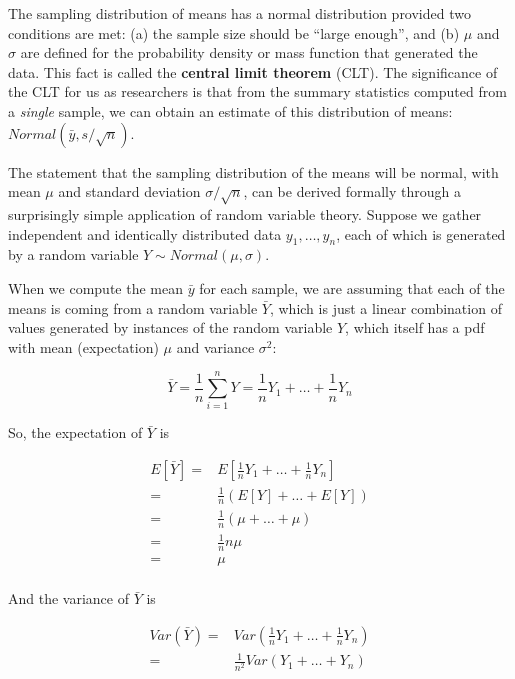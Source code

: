 \documentclass[12pt,]{krantz}
\begin{document}
The sampling distribution of means has a normal distribution provided two conditions are met: (a) the sample size should be ``large enough'', and (b) \(\mu\) and \(\sigma\) are defined for the probability density or mass function that generated the data. This fact is called the \textbf{central limit theorem} (CLT). The significance of the CLT for us as researchers is that from the summary statistics computed from a \emph{single} sample, we can obtain an estimate of this distribution of means: \(Normal(\bar{y},s/\sqrt{n})\).

The statement that the sampling distribution of the means will be normal, with mean \(\mu\) and standard deviation \(\sigma/\sqrt{n}\), can be derived formally through a surprisingly simple application of random variable theory. Suppose we gather independent and identically distributed data \(y_1, \dots, y_n\), each of which is generated by a random variable \(Y\sim Normal(\mu,\sigma)\).

When we compute the mean \(\bar{y}\) for each sample, we are assuming that each of the means is coming from a random variable \(\bar{Y}\), which is just a linear combination of values generated by instances of the random variable \(Y\), which itself has a pdf with mean (expectation) \(\mu\) and variance \(\sigma^2\):

\begin{equation}
\bar{Y}=\frac{1}{n} \sum_{i=1}^n Y = \frac{1}{n}Y_1 + \dots + \frac{1}{n}Y_n
 \end{equation}

So, the expectation of \(\bar{Y}\) is

\begin{equation}
\begin{split}
E[\bar{Y}] =& E[\frac{1}{n}Y_1 + \dots + \frac{1}{n}Y_n]\\
=& \frac{1}{n} (E[Y] + \dots + E[Y])\\
=& \frac{1}{n} (\mu + \dots + \mu)\\
=& \frac{1}{n} n\mu \\
=& \mu \\
\end{split}
\end{equation}

And the variance of \(\bar{Y}\) is

\begin{equation}
\begin{split}
Var(\bar{Y}) =& Var(\frac{1}{n}Y_1 + \dots + \frac{1}{n}
Y_n)\\
=& \frac{1}{n^2} Var(Y_1 + \dots + Y_n)\\
\end{split}
\end{equation}
\end{document}
